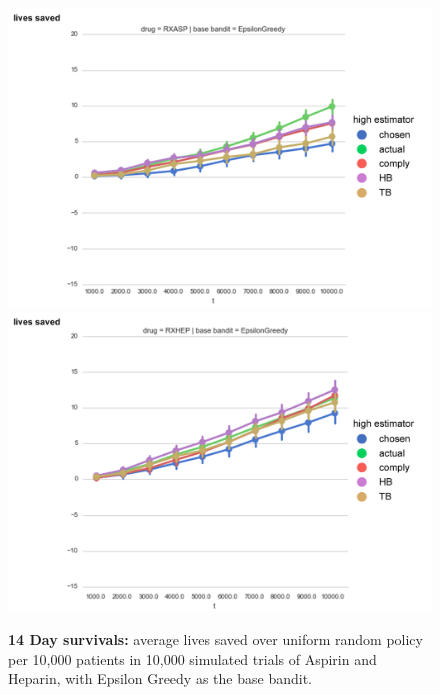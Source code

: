 \begin{figure}
\begin{center}
\includegraphics[width=1\columnwidth]{bandit/figs/fig1-3.jpg}
\includegraphics[width=1\columnwidth]{bandit/figs/fig1-4.jpg}
\caption{\textbf{14 Day survivals:} average lives saved over uniform random policy per 10,000 patients in 10,000 simulated trials of Aspirin and Heparin, with Epsilon Greedy as the base bandit.}
\end{center}
\end{figure} 
